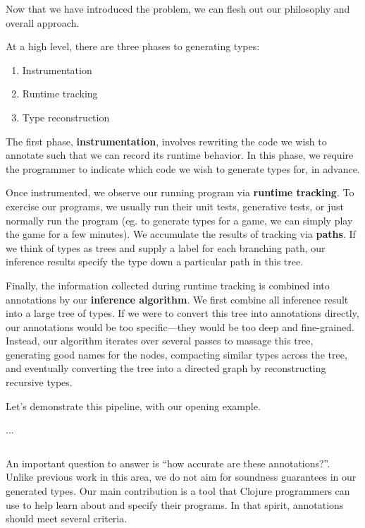
Now that we have introduced the problem,
we can flesh out our philosophy and overall
approach.

At a high level, there are three phases to
generating types:

\begin{enumerate}
  \item Instrumentation
  \item Runtime tracking
  \item Type reconstruction
\end{enumerate}

The first phase, \textbf{instrumentation}, involves
rewriting the code we wish to annotate such
that we can record its runtime behavior.
In this phase, we require the programmer to
indicate which code we wish to generate types
for, in advance.

Once instrumented, we observe our running program
via \textbf{runtime tracking}. To exercise our programs,
we usually run their unit tests, generative tests,
or just normally run the program (eg. to generate types for
a game, we can simply play the game for a few minutes).
We accumulate the results of tracking via \textbf{paths}.
If we think of types as trees and supply a label
for each branching path, our inference results
specify the type down a particular path in this tree.

Finally, the information collected during runtime tracking
is combined into annotations by our \textbf{inference algorithm}.
We first combine all inference result into a large tree of
types. If we were to convert this tree into annotations directly,
our annotations would be too specific---they would be too
deep and fine-grained.
Instead, our algorithm iterates over several passes to massage
this tree, generating good names for the nodes, compacting similar
types across the tree, and
eventually converting the tree into a directed graph by reconstructing
recursive types.

Let's demonstrate this pipeline, with our opening example.

...

\begin{verbatim}

\end{verbatim}

An important question to answer is ``how accurate are these annotations?''.
Unlike previous work in this area, we do not aim for soundness guarantees
in our generated types. 
Our main contribution is a tool that Clojure programmers
can use to help learn about and specify their programs.
In that spirit, annotations should meet several criteria.

